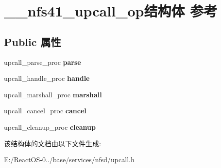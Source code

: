 \hypertarget{struct____nfs41__upcall__op}{}\section{\+\_\+\+\_\+nfs41\+\_\+upcall\+\_\+op结构体 参考}
\label{struct____nfs41__upcall__op}
\subsection*{Public 属性}
\begin{DoxyCompactItemize}
\item 
\mbox{\label{struct____nfs41__upcall__op_a0298efdd2202aa16a35376a2fec67e4e}} 
upcall\+\_\+parse\+\_\+proc {\bfseries parse}
\item 
\mbox{\label{struct____nfs41__upcall__op_a99ce776ec55de759373353accebda1bd}} 
upcall\+\_\+handle\+\_\+proc {\bfseries handle}
\item 
\mbox{\label{struct____nfs41__upcall__op_aaec1cdf05aa5eadc947a8b2e442943e1}} 
upcall\+\_\+marshall\+\_\+proc {\bfseries marshall}
\item 
\mbox{\label{struct____nfs41__upcall__op_a5ca1d7b3d78bbb403844b4e7138ef947}} 
upcall\+\_\+cancel\+\_\+proc {\bfseries cancel}
\item 
\mbox{\label{struct____nfs41__upcall__op_add4a01dffd444d2a0b25c3531b91ccbd}} 
upcall\+\_\+cleanup\+\_\+proc {\bfseries cleanup}
\end{DoxyCompactItemize}


该结构体的文档由以下文件生成\+:\begin{DoxyCompactItemize}
\item 
E\+:/\+React\+O\+S-\/0../base/services/nfsd/upcall.\+h\end{DoxyCompactItemize}
